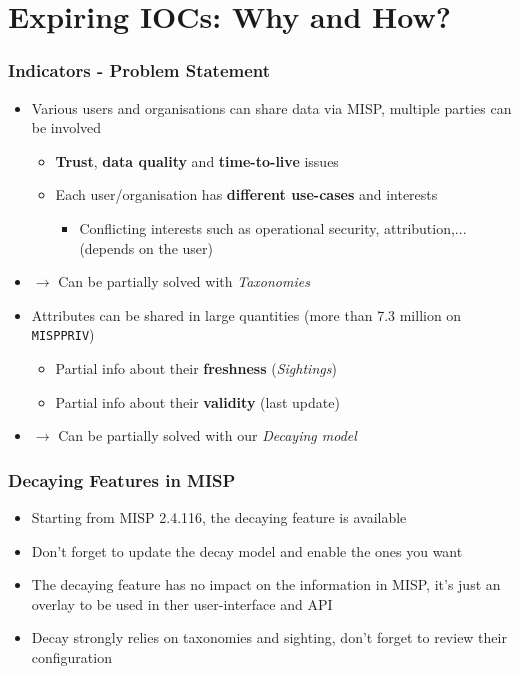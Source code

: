 
\begin{frame}[t,plain]
\titlepage
\end{frame}

\section{Expiring IOCs: Why and How?}
\begin{frame}
\frametitle{Indicators - Problem Statement}
    \begin{itemize}
        \item Various users and organisations can share data via MISP, multiple parties can be involved
        \begin{itemize}
            \item \textbf{Trust}, \textbf{data quality} and \textbf{time-to-live} issues
            \item Each user/organisation has \textbf{different use-cases} and interests
                \begin{itemize}
                    \item Conflicting interests such as operational security, attribution,... (depends on the user)
                \end{itemize}
        \end{itemize}
        \item[] $\rightarrow$ Can be partially solved with \textit{Taxonomies}
        \pause
        \vspace{0.5cm}
        \item Attributes can be shared in large quantities (more than 7.3 million on \texttt{MISPPRIV})
        \begin{itemize}
            \item Partial info about their \textbf{freshness} (\textit{Sightings})
            \item Partial info about their \textbf{validity} (last update)
        \end{itemize}
        \item[] $\rightarrow$ Can be partially solved with our \textit{Decaying model}
    \end{itemize}
\end{frame}

\begin{frame}
\frametitle{Decaying Features in MISP}
        \begin{itemize}
        \item Starting from MISP 2.4.116, the decaying feature is available
        \item Don't forget to update the decay model and enable the ones you want
        \item The decaying feature has no impact on the information in MISP, it's just an overlay to be used in ther user-interface and API
        \item Decay strongly relies on taxonomies and sighting, don't forget to review their configuration
        \end{itemize}
\end{frame}

